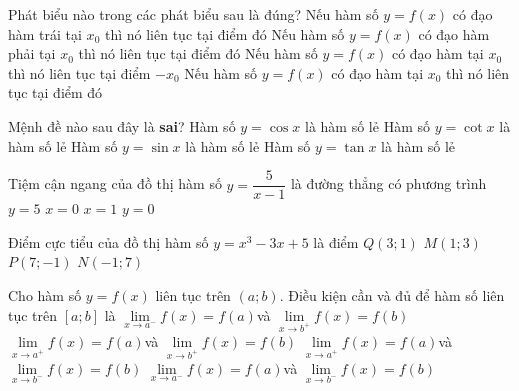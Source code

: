 \begin{ex}%
	Phát biểu nào trong các phát biểu sau là đúng?
	\choice
	{Nếu hàm số $y=f(x)$ có đạo hàm trái tại $x_0$ thì nó liên tục tại điểm đó}
	{Nếu hàm số $y=f(x)$ có đạo hàm phải tại $x_0$ thì nó liên tục tại điểm đó}
	{Nếu hàm số $y=f(x)$ có đạo hàm tại $x_0$ thì nó liên tục tại điểm $ - x_0$}
	{\True Nếu hàm số $y=f(x)$ có đạo hàm tại $x_0$ thì nó liên tục tại điểm đó}
\end{ex}

\begin{ex}%
 Mệnh đề nào sau đây là \textbf{sai}?
	\choice
	{\True Hàm số $y=\cos x$ là hàm số lẻ}
	{Hàm số $y=\cot x$ là hàm số lẻ}
	{Hàm số $y=\sin x$ là hàm số lẻ}
	{Hàm số $y=\tan x$ là hàm số lẻ}
\end{ex}
\begin{ex}%
Tiệm cận ngang của đồ thị hàm số $y=\dfrac{5}{x - 1}$ là đường thẳng có phương trình
	\choice
	{$y=5$}
	{$x=0$}
	{$x=1$}
	{\True $y=0$}
\end{ex}
\begin{ex}%
Điểm cực tiểu của đồ thị hàm số $y=x^3 - 3x + 5$ là điểm
\choice
{$Q\left(3; 1\right)$}
{\True $M\left(1; 3\right)$}
{$P(7; - 1)$}
{$N(- 1; 7)$}
\end{ex}
\begin{ex}%
	Cho hàm số $y=f(x)$ liên tục trên $\left(a; b\right)$. Điều kiện cần và đủ để hàm số liên tục trên $[a; b]$ là
	\choice
	{$\underset{x\to a^{-}}{\mathop{\lim}}f(x)=f(a)$và $\underset{x\to b^{+}}{\mathop{\lim}}f(x)=f(b)$}
	{$\underset{x\to a^{+}}{\mathop{\lim}}f(x)=f(a)$và $\underset{x\to b^{+}}{\mathop{\lim}}f(x)=f(b)$}
	{\True $\underset{x\to a^{+}}{\mathop{\lim}}f(x)=f(a)$và $\underset{x\to b^{-}}{\mathop{\lim}}f(x)=f(b)$}
	{$\underset{x\to a^{-}}{\mathop{\lim}}f(x)=f(a)$và $\underset{x\to b^{-}}{\mathop{\lim}}f(x)=f(b)$}
\end{ex}
